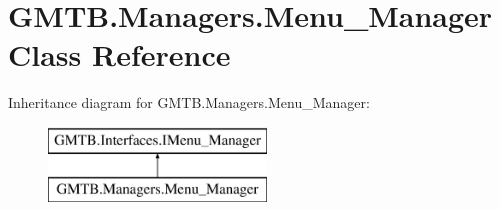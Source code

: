 \hypertarget{class_g_m_t_b_1_1_managers_1_1_menu___manager}{}\section{G\+M\+T\+B.\+Managers.\+Menu\+\_\+\+Manager Class Reference}
\label{class_g_m_t_b_1_1_managers_1_1_menu___manager}
Inheritance diagram for G\+M\+T\+B.\+Managers.\+Menu\+\_\+\+Manager\+:\begin{figure}[H]
\begin{center}
\leavevmode
\includegraphics[height=2.000000cm]{class_g_m_t_b_1_1_managers_1_1_menu___manager}
\end{center}
\end{figure}
